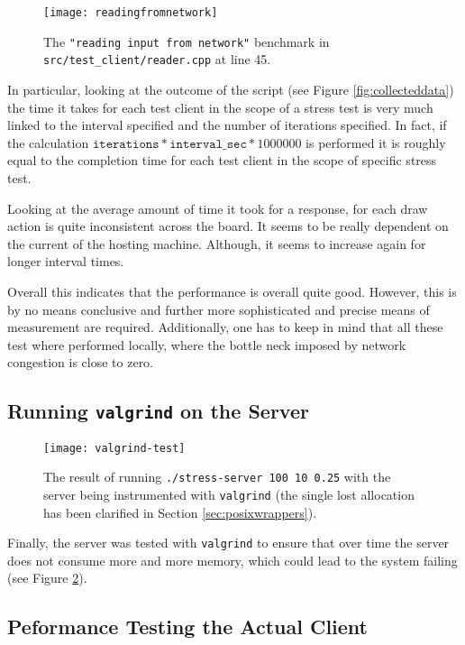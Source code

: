 \documentclass[article]{uom-coursework}
\begin{document}
\begin{figure}[H]
\centering
\texttt{[image: readingfromnetwork]}
\caption{The \texttt{"reading input from network"} benchmark in
\texttt{src/test\_client/reader.cpp} at line 45.}
\label{fig:readingfromnetwork}
\end{figure}

In particular, looking at the outcome of the script (see Figure
\ref{fig:collecteddata}) the time it takes for each test client
in the scope of a stress test is very much linked to the
interval specified and the number of iterations specified. In
fact, if the calculation $\mathtt{iterations} *
\mathtt{interval\_sec} * 1000000$ is performed it is roughly
equal to the completion time for each test client in the scope
of specific stress test.

Looking at the average amount of time it took for a response,
for each draw action is quite inconsistent across the board. It
seems to be really dependent on the current of the hosting
machine. Although, it seems to increase again for longer
interval times.

Overall this indicates that the performance is overall quite
good. However, this is by no means conclusive and further more
sophisticated and precise means of measurement are required.
Additionally, one has to keep in mind that all these test where
performed locally, where the bottle neck imposed by network
congestion is close to zero.

\subsection{Running \texttt{valgrind} on the Server}

\begin{figure}[H]
\centering
\texttt{[image: valgrind-test]}
\caption{The result of running \texttt{./stress-server 100 10
0.25} with the server being instrumented with
\texttt{valgrind} (the single lost allocation has
been clarified in Section \ref{sec:posixwrappers}).}
\label{fig:valgrindservertest}
\end{figure}

Finally, the server was tested with \texttt{valgrind} to ensure
that over time the server does not consume more and more memory,
which could lead to the system failing (see Figure
\ref{fig:valgrindservertest}).

\subsection{Peformance Testing the Actual Client}
\end{document}
